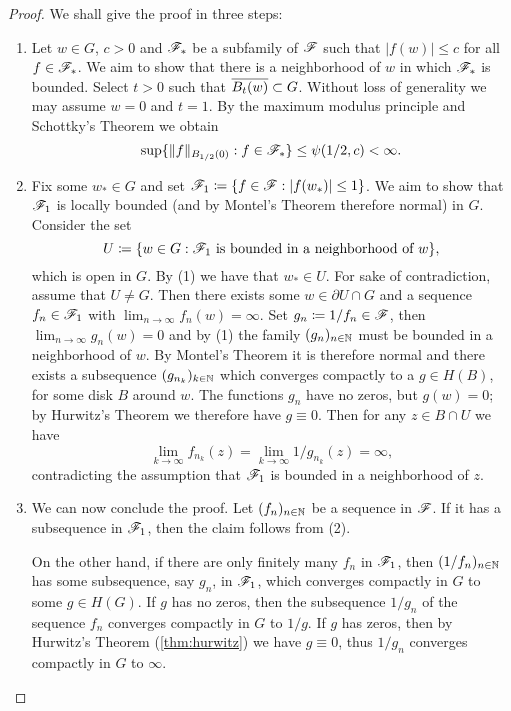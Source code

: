 \begin{proof}
    We shall give the proof in three steps:
    \begin{enumerate}
        \item Let $w \in G$, $c > 0$ and $\mathscr{F}_*$ be a subfamily of $\mathscr{F}$ such that $\vert f(w) \vert \leq c$ for all $f \in \mathscr{F}_*$. We aim to show that there is a neighborhood of $w$ in which $\mathscr{F}_*$ is bounded. Select $t > 0$ such that $\overline{B_t(w)} \subset G$. Without loss of generality we may assume $w = 0$ and $t = 1$. By the maximum modulus principle and Schottky's Theorem we obtain
        $$ \sup \{ \Vert f \Vert_{B_{1/2}(0)} : f \in \mathscr{F}_* \} \leq \psi(1/2, c) < \infty. $$

        \item Fix some $w_* \in G$ and set $\mathscr{F}_1 \coloneqq \{ f \in \mathscr{F} : \vert f(w_*) \vert \leq 1 \}$. We aim to show that $\mathscr{F}_1$ is locally bounded (and by Montel's Theorem therefore normal) in $G$. Consider the set
        $$ U \coloneqq \{ w \in G : \mathscr{F}_1 \textrm{ is bounded in a neighborhood of } w \}, $$
        which is open in $G$. By (1) we have that $w_* \in U$. For sake of contradiction, assume that $U \neq G$. Then there exists some $w \in \partial U \cap G$ and a sequence $f_n \in \mathscr{F}_1$ with $\lim_{n \to \infty} f_n(w) = \infty$. Set $g_n \coloneqq 1 / f_n \in \mathscr{F}$, then $\lim_{n \to \infty} g_n(w) = 0$ and by (1) the family $(g_n)_{n \in \mathbb{N}}$ must be bounded in a neighborhood of $w$. By Montel's Theorem it is therefore normal and there exists a subsequence $(g_{n_k})_{k \in \mathbb{N}}$ which converges compactly to a $g \in H(B)$, for some disk $B$ around $w$. The functions $g_n$ have no zeros, but $g(w) = 0$; by Hurwitz's Theorem we therefore have $g \equiv 0$. Then for any $z \in B \cap U$ we have
        $$ \lim_{k \to \infty} f_{n_k}(z) = \lim_{k \to \infty} 1 / g_{n_k}(z) = \infty, $$
        contradicting the assumption that $\mathscr{F}_1$ is bounded in a neighborhood of $z$.

        \item We can now conclude the proof. Let $(f_n)_{n \in \mathbb{N}}$ be a sequence in $\mathscr{F}$. If it has a subsequence in $\mathscr{F}_1$, then the claim follows from (2).
        
        On the other hand, if there are only finitely many $f_n$ in $\mathscr{F}_1$, then $(1 / f_n)_{n \in \mathbb{N}}$ has some subsequence, say $g_n$, in $\mathscr{F}_1$, which converges compactly in $G$ to some $g \in H(G)$. If $g$ has no zeros, then the subsequence $1 / g_n$ of the sequence $f_n$ converges compactly in $G$ to $1 / g$. If $g$ has zeros, then by Hurwitz's Theorem (\ref{thm:hurwitz}) we have $g \equiv 0$, thus $1 / g_n$ converges compactly in $G$ to $\infty$.
    \end{enumerate}
\end{proof}

